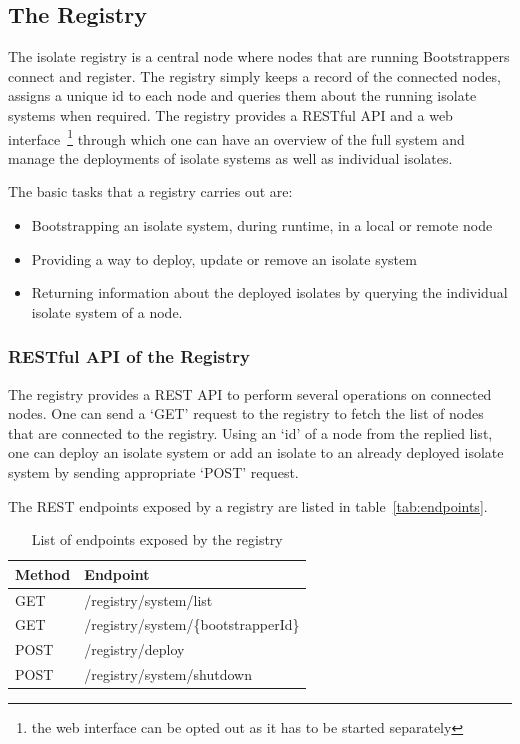 \subsection{The Registry}
\label{subsec:registry}
The isolate registry is a central node where nodes that are running Bootstrappers connect and register. The registry simply keeps a record of the connected nodes, assigns a unique id to each node and queries them about the running isolate systems when required. The registry provides a RESTful API and a web interface~\footnote{the web interface can be opted out as it has to be started separately} through which one can have an overview of the full system and manage the deployments of isolate systems as well as individual isolates.

The basic tasks that a registry carries out are:
\begin{itemize}
  \item Bootstrapping an isolate system, during runtime, in a local or remote node
  \item Providing a way to deploy, update or remove an isolate system
  \item Returning information about the deployed isolates by querying the individual isolate system of a node.
\end{itemize}

  \subsubsection{RESTful API of the Registry}
  \label{subsec:restApi}
  The registry provides a REST API to perform several operations on connected nodes. One can send a ‘GET’ request to the registry to fetch the list of nodes that are connected to the registry. Using an ‘id’ of a node from the replied list, one can deploy an isolate system or add an isolate to an already deployed isolate system by sending appropriate ‘POST’ request.

  The REST endpoints exposed by a registry are listed in table~\autoref{tab:endpoints}.
  \begin{table}[H]
    \caption[Endpoints exposed by the registry]{List of endpoints exposed by the registry}\label{tab:endpoints}
    \centering
    \begin{tabular}{l l}
      \toprule
        \bf{Method}  & \bf{Endpoint} \\
      \midrule
        GET &  /registry/system/list\\
        GET & /registry/system/\{bootstrapperId\} \\
        POST & /registry/deploy \\
        POST & /registry/system/shutdown \\
      \bottomrule
    \end{tabular}
  \end{table}

